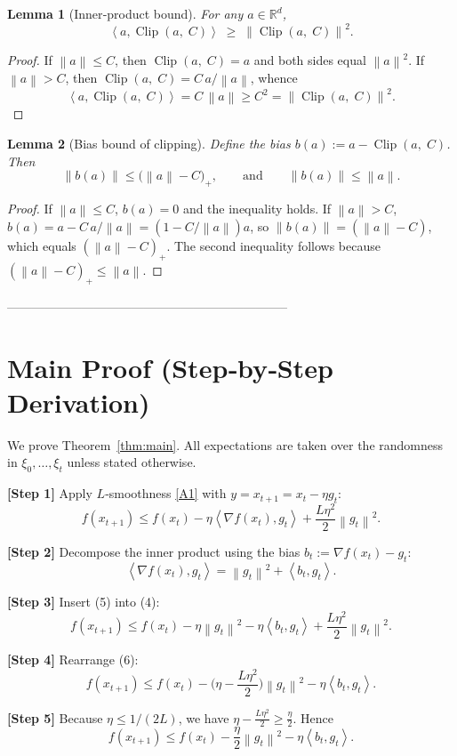\documentclass{article}
\newtheorem{lemma}{Lemma}
\newcommand{\clip}[2]{\operatorname{Clip}\!\left(#1,\;#2\right)}
\newcommand{\norm}[1]{\left\|#1\right\|}
\newcommand{\inner}[2]{\left\langle #1,#2\right\rangle}
\newcommand{\R}{\mathbb{R}}
\begin{document}
\begin{lemma}[Inner‑product bound]\label{lem:inner}
For any $a\in\R^{d}$,
\[
\inner{a}{\clip{a}{C}}\;\ge\;\norm{\clip{a}{C}}^{2}.
\tag{L1}
\]
\end{lemma}
\begin{proof}
If $\norm{a}\le C$, then $\clip{a}{C}=a$ and both sides equal $\norm{a}^{2}$.
If $\norm{a}>C$, then $\clip{a}{C}=C\,a/\norm{a}$, whence
\[
\inner{a}{\clip{a}{C}}=C\,\norm{a}\ge C^{2}= \norm{\clip{a}{C}}^{2}.
\]
\end{proof}

\begin{lemma}[Bias bound of clipping]\label{lem:clipbias}
Define the bias $b(a):=a-\clip{a}{C}$. Then
\[
\norm{b(a)}\le \big(\norm{a}-C\big)_{+},
\qquad
\text{and}\qquad
\norm{b(a)}\le \norm{a}.
\tag{L2}
\]
\end{lemma}
\begin{proof}
If $\norm{a}\le C$, $b(a)=0$ and the inequality holds.
If $\norm{a}>C$, $b(a)=a-C\,a/\norm{a}=(1-C/\norm{a})a$,
so $\norm{b(a)}=(\norm{a}-C)$, which equals $(\norm{a}-C)_{+}$.
The second inequality follows because $(\norm{a}-C)_{+}\le \norm{a}$.
\end{proof}

--------------------------------------------------------------------
\section*{Main Proof (Step‑by‑Step Derivation)}
We prove Theorem~\ref{thm:main}.  All expectations are taken over the randomness
in $\xi_0,\dots,\xi_{t}$ unless stated otherwise.

\noindent\textbf{[Step 1]} Apply $L$‑smoothness \eqref{A1} with $y=x_{t+1}=x_t-\eta g_t$:
\[
f(x_{t+1})\le f(x_t)-\eta\inner{\nabla f(x_t)}{g_t}
+\frac{L\eta^{2}}{2}\norm{g_t}^{2}.
\tag{4}
\]

\noindent\textbf{[Step 2]} Decompose the inner product using the bias $b_t:=\nabla f(x_t)-g_t$:
\[
\inner{\nabla f(x_t)}{g_t}
= \norm{g_t}^{2}+ \inner{b_t}{g_t}.
\tag{5}
\]

\noindent\textbf{[Step 3]} Insert (5) into (4):
\[
f(x_{t+1})\le f(x_t)-\eta\norm{g_t}^{2}
-\eta\inner{b_t}{g_t}
+\frac{L\eta^{2}}{2}\norm{g_t}^{2}.
\tag{6}
\]

\noindent\textbf{[Step 4]} Rearrange (6):
\[
f(x_{t+1})\le f(x_t)-\Big(\eta-\frac{L\eta^{2}}{2}\Big)\norm{g_t}^{2}
-\eta\inner{b_t}{g_t}.
\tag{7}
\]

\noindent\textbf{[Step 5]} Because $\eta\le 1/(2L)$, we have $\eta-\frac{L\eta^{2}}{2}\ge \frac{\eta}{2}$.
Hence
\[
f(x_{t+1})\le f(x_t)-\frac{\eta}{2}\norm{g_t}^{2}
-\eta\inner{b_t}{g_t}.
\tag{8}
\]
\end{document}
